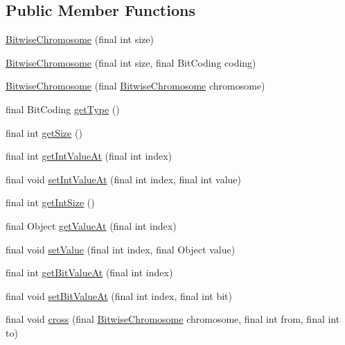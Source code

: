 \subsection*{Public Member Functions}
\begin{CompactItemize}
\item 
\hyperlink{classjenes_1_1chromosome_1_1_bitwise_chromosome_87547c87419943bded51820cbc1ae830}{BitwiseChromosome} (final int size)
\item 
\hyperlink{classjenes_1_1chromosome_1_1_bitwise_chromosome_9109a8205e447db9032f29494f0d9b3d}{BitwiseChromosome} (final int size, final BitCoding coding)
\item 
\hyperlink{classjenes_1_1chromosome_1_1_bitwise_chromosome_90798d86b6c1871c441b562e0b1d50ca}{BitwiseChromosome} (final \hyperlink{classjenes_1_1chromosome_1_1_bitwise_chromosome}{BitwiseChromosome} chromosome)
\item 
final BitCoding \hyperlink{classjenes_1_1chromosome_1_1_bitwise_chromosome_905b92cd6dc14db9d2b9276f1a6686e9}{getType} ()
\item 
final int \hyperlink{classjenes_1_1chromosome_1_1_bitwise_chromosome_e59ae8f495ec9d5aa15712cee7c0b313}{getSize} ()
\item 
final int \hyperlink{classjenes_1_1chromosome_1_1_bitwise_chromosome_f817cb2110fc6b8d415e46377ddd4911}{getIntValueAt} (final int index)
\item 
final void \hyperlink{classjenes_1_1chromosome_1_1_bitwise_chromosome_3cbcf428333a0dc4209ce2c820054542}{setIntValueAt} (final int index, final int value)
\item 
final int \hyperlink{classjenes_1_1chromosome_1_1_bitwise_chromosome_36e6b8c849d563a359245763116667d5}{getIntSize} ()
\item 
final Object \hyperlink{classjenes_1_1chromosome_1_1_bitwise_chromosome_3061d34e1f0c0faa915d4da7ea2f615c}{getValueAt} (final int index)
\item 
final void \hyperlink{classjenes_1_1chromosome_1_1_bitwise_chromosome_aa42be8f0c26735e8a8d603d9b743b6a}{setValue} (final int index, final Object value)
\item 
final int \hyperlink{classjenes_1_1chromosome_1_1_bitwise_chromosome_05ce80f3729d007c5d550eef5969ac86}{getBitValueAt} (final int index)
\item 
final void \hyperlink{classjenes_1_1chromosome_1_1_bitwise_chromosome_2e746b511933914d4be452573ac5ab7c}{setBitValueAt} (final int index, final int bit)
\item 
final void \hyperlink{classjenes_1_1chromosome_1_1_bitwise_chromosome_2d711baa2a74ccb064d33ef73edbd464}{cross} (final \hyperlink{classjenes_1_1chromosome_1_1_bitwise_chromosome}{BitwiseChromosome} chromosome, final int from, final int to)

\end{CompactItemize}
